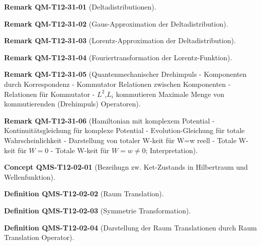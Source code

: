 \documentclass[10pt, letterpaper]{article}
\newcommand{\CustomHeading}[3]{%
  \par\medskip\noindent%
  \textbf{#1 #2} \textnormal{(#3)}.\enskip%
}
\newenvironment{DEF}[2]{\CustomHeading{Definition}{#1}{#2}}{}
\newenvironment{REM}[2]{\CustomHeading{Remark}{#1}{#2}}{}
\newenvironment{CONC}[2]{\CustomHeading{Concept}{#1}{#2}}{}
\begin{document}
\begin{REM}{QM-T12-31-01}{Deltadistributionen}
\end{REM}

\begin{REM}{QM-T12-31-02}{Gaus-Approximation der Deltadistribution}
\end{REM}

\begin{REM}{QM-T12-31-03}{Lorentz-Approximation der Deltadistribution}
\end{REM}

\begin{REM}{QM-T12-31-04}{Fouriertransformation der Lorentz-Funktion}
\end{REM}

\begin{REM}{QM-T12-31-05}{Quantenmechanischer Drehimpuls
- Komponenten durch Korrespondenz
- Kommutator Relationen zwischen Komponenten
- Relationen für Kommutator
- $L^2$,$L_i$ kommutieren
Maximale Menge von kommutierenden (Drehimpuls) Operatoren}
\end{REM}

\begin{REM}{QM-T12-31-06}{Hamiltonian mit komplexem Potential
- Kontinuitätsgleichung für komplexe Potential
- Evolution-Gleichung für totale Wahrscheinlichkeit
- Darstellung von totaler W-keit für W=w reell
- Totale W-keit für $W=0$
- Totale W-keit für $W=w\neq 0$; Interpretation}
\end{REM}

\begin{CONC}{QMS-T12-02-01}{Bezeihugn zw. Ket-Zustands in Hilbertraum und Wellenfunktion}
\end{CONC}

\begin{DEF}{QMS-T12-02-02}{Raum Translation}
\end{DEF}

\begin{DEF}{QMS-T12-02-03}{Symmetrie Transformation}
\end{DEF}

\begin{DEF}{QMS-T12-02-04}{Darstellung der Raum Translationen durch Raum Translation Operator}
\end{DEF}
\end{document}
